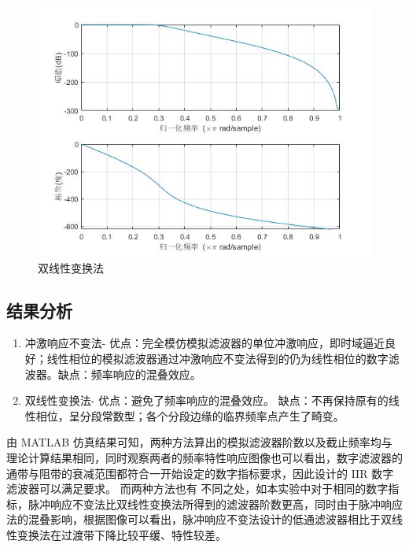 \documentclass{seuer}
\begin{document}
\begin{figure}[H] %
	\centering %
	\includegraphics[width=1\textwidth]{"../DSPAssignment/双线性变换法.jpg"} %
	\caption{双线性变换法} %
	\label{Fig6} %
\end{figure}
\subsection{结果分析}
\begin{enumerate}
	\item 冲激响应不变法- 优点：完全模仿模拟滤波器的单位冲激响应，即时域逼近良好；线性相位的模拟滤波器通过冲激响应不变法得到的仍为线性相位的数字滤波器。缺点：频率响应的混叠效应。
	\item 双线性变换法- 优点：避免了频率响应的混叠效应。	缺点：不再保持原有的线性相位，呈分段常数型；各个分段边缘的临界频率点产生了畸变。
\end{enumerate}
由 MATLAB 仿真结果可知，两种方法算出的模拟滤波器阶数以及截止频率均与理论计算结果相同，同时观察两者的频率特性响应图像也可以看出，数字滤波器的通带与阻带的衰减范围都符合一开始设定的数字指标要求，因此设计的 IIR 数字滤波器可以满足要求。 而两种方法也有
不同之处，如本实验中对于相同的数字指标，脉冲响应不变法比双线性变换法所得到的滤波器阶数更高，同时由于脉冲响应法的混叠影响，根据图像可以看出，脉冲响应不变法设计的低通滤波器相比于双线性变换法在过渡带下降比较平缓、特性较差。
\end{document}
